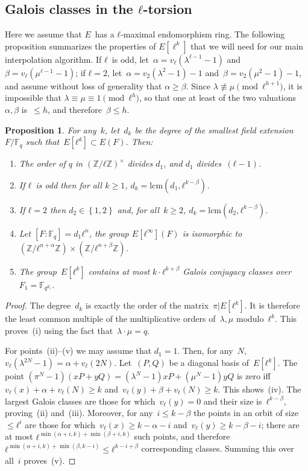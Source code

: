 \documentclass{lms}
\newtheorem{prop}[thm]{Proposition}
\def\acco#1{\left\{#1\right\}}
\newcommand{\F}{\mathbb{F}}
\begin{document}
\subsection{Galois classes in the $ℓ$-torsion}
Here we assume that $E$~has a $ℓ$-maximal endomorphism ring.  The
following proposition summarizes the properties of $E[\ell^k]$ that we
will need for our main interpolation algorithm.  If $ℓ$~is odd, let~$α
= v_ℓ(λ^{ℓ-1}-1)$ and~$β=v_ℓ(μ^{ℓ-1}-1)$; if $ℓ=2$,
let~$α=v_2(λ^2-1)-1$ and~$β = v_2(μ^2-1)-1$, and assume without loss
of generality that $α ≥ β$.  Since $λ ≢ μ \pmod{ℓ^{h+1}}$, it is
impossible that $λ ≡ μ ≡ 1 \pmod{ℓ^h}$, so that one at least of the two
valuations~$α, β$ is~$≤ h$, and therefore~$β ≤ h$.
\label{sub:classes}
\begin{prop}\label{prop:classes}
For any~$k$, let~$d_k$ be the degree of the smallest field extension $F/\F_q$
such that~$E[ℓ^k]⊂E(F)$. Then:
\begin{enumerate}
\item The order of $q$ in $(ℤ/ℓℤ)^×$ divides $d_1$,
and $d_1$ divides~$(ℓ-1)$.
\item If $ℓ$~is odd then for all $k ≥ 1$,
$d_k = \mathrm {lcm} (d_1, ℓ^{k-β})$.
\item If $ℓ=2$ then $d_2 ∈ \acco{1,2}$ and, for all~$k ≥ 2$,
$d_k = \mathrm{lcm}(d_2, ℓ^{k-β})$.
\item Let $[F:\F_q]=d_1ℓ^n$, the group $E[ℓ^{∞}](F)$ is isomorphic to~$(ℤ/ℓ^{n+α} ℤ) × (ℤ/ℓ^{n+β} ℤ)$.
\item\label{prop:classes:count} The group~$E[ℓ^k]$ contains at most
$k · ℓ^{k+β}$ Galois conjugacy classes over~$F_1 = \F_{q^{d_1}}$.
\end{enumerate}
\end{prop}
\begin{proof}
The degree~$d_k$ is exactly the order of the matrix~$π|E[ℓ^k]$.
It is therefore the least common multiple of the multiplicative orders
of~$λ, μ$ modulo~$ℓ^k$.
This proves~(i) using the fact that~$λ · μ = q$.

For points~(ii)--(v) we may assume that $d_1 = 1$.
Then, for any~$N$, $v_ℓ(λ^{2N}-1) = α + v_{ℓ} (2N)$.
Let~$(P, Q)$ be a diagonal basis of~$E[ℓ^k]$.
The point $(π^N - 1) (x P + y Q) = (λ^N-1) x P + (μ^N-1) y Q$
is zero iff $v_{ℓ} (x) + α + v_{ℓ} (N) ≥ k$
and~$v_{ℓ} (y) + β + v_{ℓ} (N) ≥ k$. This shows~(iv).
The largest Galois classes
are those for which~$v_{ℓ} (y) = 0$ and their size is~$ℓ^{k - β}$,
proving~(ii) and~(iii).
Moreover, for any~$i ≤ k-β$ the points in an orbit of size~$≤ ℓ^i$
are those for which~$v_{ℓ} (x) ≥ k - α - i$ and~$v_{ℓ} (y) ≥ k - β - i$;
there are at most $ℓ^{\min(α+i, k) + \min (β+i, k)}$ such points,
and therefore $ℓ^{\min(α+i, k) + \min(β, k-i)} ≤ ℓ^{k-i+β}$
corresponding classes.
Summing this over all~$i$ proves~(v).
\end{proof}
\end{document}
